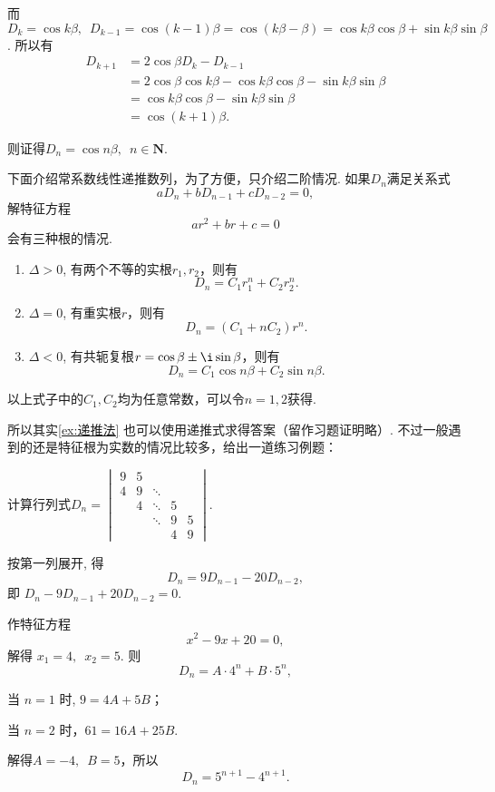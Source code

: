 \begin{solution}
    而$D_{k}=\cos k \beta,\enspace
        D_{k-1}=\cos (k-1)\beta = \cos (k \beta-\beta) = \cos k \beta \cos \beta+\sin k \beta \sin \beta$. 所以有
    \begin{align*}
        D_{k+1} & = 2 \cos \beta D_{k}-D_{k-1}                                               \\
                & =2 \cos \beta \cos k \beta-\cos k \beta \cos \beta-\sin k \beta \sin \beta \\
                & =\cos k \beta \cos \beta-\sin k \beta \sin \beta                           \\
                & =\cos (k+1) \beta.
    \end{align*}

    则证得$D_n=\cos n\beta,\enspace n\in \mathbf{N}$.
\end{solution}

下面介绍常系数线性递推数列，为了方便，只介绍二阶情况. 如果$D_n$满足关系式
\[ aD_n+bD_{n-1}+cD_{n-2}=0, \]
解特征方程
\[ ar^2+br+c=0 \]
会有三种根的情况.
\begin{enumerate}
    \item $\Delta>0$, 有两个不等的实根$r_1, r_2$，则有
          \[ D_n=C_1r_1^n+C_2r_2^n. \]

    \item $\Delta=0$, 有重实根$r$，则有
          \[ D_n=(C_1+nC_2)r^n. \]

    \item $\Delta<0$, 有共轭复根$r=\cos\beta\pm \i\sin\beta$，则有
          \[ D_n=C_1\cos n\beta + C_2\sin n\beta. \]
\end{enumerate}
以上式子中的$C_1,C_2$均为任意常数，可以令$n=1,2$获得.

所以其实\autoref{ex:递推法} 也可以使用递推式求得答案（留作习题证明略）. 不过一般遇到的还是特征根为实数的情况比较多，给出一道练习例题：

\begin{example}{}{}
    计算行列式$D_n=
        \begin{vmatrix}
            9 & 5 &        &   &   \\
            4 & 9 & \ddots &   &   \\
              & 4 & \ddots & 5 &   \\
              &   & \ddots & 9 & 5 \\
              &   &        & 4 & 9
        \end{vmatrix}$.
\end{example}

\begin{solution}
    按第一列展开, 得
    \[ D_n=9 D_{n-1}-20 D_{n-2}, \]
    即 $ D_n-9 D_{n-1}+20 D_{n-2}=0 $.

    作特征方程
    \[ x^{2}-9 x+20=0, \]
    解得 $ x_1=4,\enspace x_2=5 $. 则
    \[ D_n=A \cdot 4^n+B \cdot 5^n, \]

    当 $n=1$ 时, $9=4A+5B$；

    当 $n=2$ 时，$61=16A+25B$.

    解得$A=-4,\enspace B=5$，所以
    \[ D_n=5^{n+1}-4^{n+1}. \]
\end{solution}

